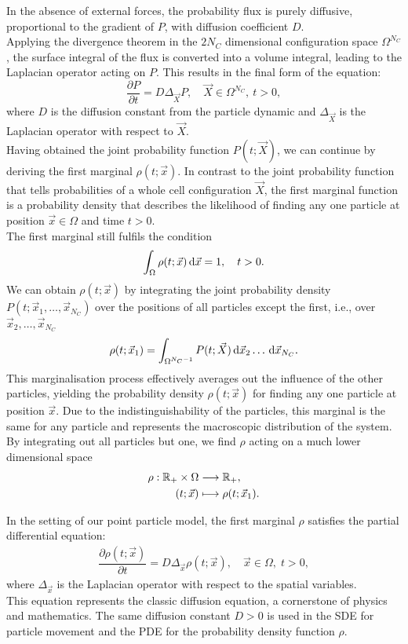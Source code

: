In the absence of external forces, the probability flux is purely diffusive, proportional to the gradient of $P$, with diffusion coefficient $D$. \\
Applying the divergence theorem in the $2N_C$ dimensional configuration space $\Omega^{N_C}$, the surface integral of the flux is converted into a volume integral, leading to the Laplacian operator acting on $P$. 
This results in the final form of the equation:
\[
	\dfrac{\partial P}{\partial t} = D \Delta_{\vec{X}} P, \quad \vec{X} \in \Omega^{N_C}, \: t>0, 
\] 
where $D$ is the diffusion constant from the particle dynamic and $\Delta_{\vec{X}}$ is the Laplacian operator with respect to $\vec{X}$. \\
Having obtained the joint probability function $P(t; \vec{X})$, we can continue by deriving the first marginal $\rho(t; \vec{x})$. 
In contrast to the joint probability function that tells probabilities of a whole cell configuration $\vec{X}$, the first marginal function is a probability density that describes the likelihood of finding any one particle at position  $\vec{x} \in \Omega$ and time $t > 0$. \\
The first marginal still fulfils the condition 
\[
	\int_{\Omega} \rho(t; \vec{x}) \, \mathrm{d} \vec{x} = 1, \quad t > 0. 
\]
We can obtain $\rho(t; \vec{x})$ by integrating the joint probability density $P(t; \vec{x}_1, \dots, \vec{x}_{N_C})$ over the positions of all particles except the first, i.e., over $\vec{x}_2, \dots, \vec{x}_{N_C}$
\[
	\rho(t; \vec{x}_1) = \int_{\Omega^{N_C-1}}  P(t; \vec{X}) \, \mathrm{d} \vec{x}_2 \ldots \, \mathrm{d} \vec{x}_{N_C}.
\]
This marginalisation process effectively averages out the influence of the other particles, yielding the probability density $\rho(t; \vec{x})$ for finding any one particle at position $\vec{x}$. 
Due to the indistinguishability of the particles, this marginal is the same for any particle and represents the macroscopic distribution of the system.
By integrating out all particles but one, we find $\rho$ acting on a much lower dimensional space 
\begin{align*}
	\rho : \mathbb{R}_{+} \times \Omega &\longrightarrow  \mathbb{R}_+, \\	
	(t; \vec{x}) &\longmapsto  \rho(t; \vec{x}_1). 
\end{align*}	

In the setting of our point particle model, the first marginal $\rho$ satisfies the partial differential equation:
\begin{align*}
	\dfrac{\partial \rho (t; \vec{x})}{\partial t} = D \Delta_{\vec{x}} \rho(t; \vec{x}), \quad \vec{x} \in \Omega, \; t>0, 
\end{align*}
where $\Delta_{\vec{x}}$ is the Laplacian operator with respect to the spatial variables. \\
This equation represents the classic diffusion equation, a cornerstone of physics and mathematics.
The same diffusion constant $D>0$ is used in the SDE for particle movement and the PDE for the probability density function $\rho$. \\

